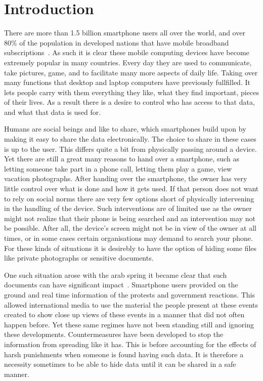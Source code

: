 \section{Introduction}
\label{sec:introduction}
There are more than 1.5 billion smartphone users all over the world\cite{smartphoneUsage}, and over 80\% of the population in developed nations that have mobile broadband subscriptions~\cite{mobileBroadband}.
As such it is clear these mobile computing devices have become extremely popular in many countries.
Every day they are used to communicate, take pictures, game, and to facilitate many more aspects of daily life.
Taking over many functions that desktop and laptop computers have previously fullfilled.
It lets people carry with them everything they like, what they find important, pieces of their lives.
As a result there is a desire to control who has access to that data, and what that data is used for.

Humans are social beings and like to share, which smartphones build upon by making it easy to share the data electronically.
The choice to share in these cases is up to the user. 
This differs quite a bit from physically passing around a device.
Yet there are still a great many reasons to hand over a smartphone, such as letting someone take part in a phone call, letting them play a game, view vacation photographs.
After handing over the smartphone, the owner has very little control over what is done and how it gets used.
If that person does not want to rely on social norms there are very few options short of physically intervening in the handling of the device.
Such interventions are of limited use as the owner might not realize that their phone is being searched and an intervention may not be possible.
After all, the device's screen might not be in view of the owner at all times, or in some cases certain organisations may demand to search your phone.
For these kinds of situations it is desirebly to have the option of hiding some files like private photographs or sensitive documents.

One such situation arose with the arab spring it became clear that such documents can have significant impact~\cite{arabSpring}.
Smartphone users provided on the ground and real time information of the protests and government reactions.
This allowed international media to use the material the people present at these events created to show close up views of these events in a manner that did not often happen before.
Yet these same regimes have not been standing still and ignoring these developments.
Countermeasures have been developed to stop the information from spreading like it has\cite{cyberResponseGovernment}.
This is before accounting for the effects of harsh punishments when someone is found having such data.
It is therefore a necessity sometimes to be able to hide data until it can be shared in a safe manner.


